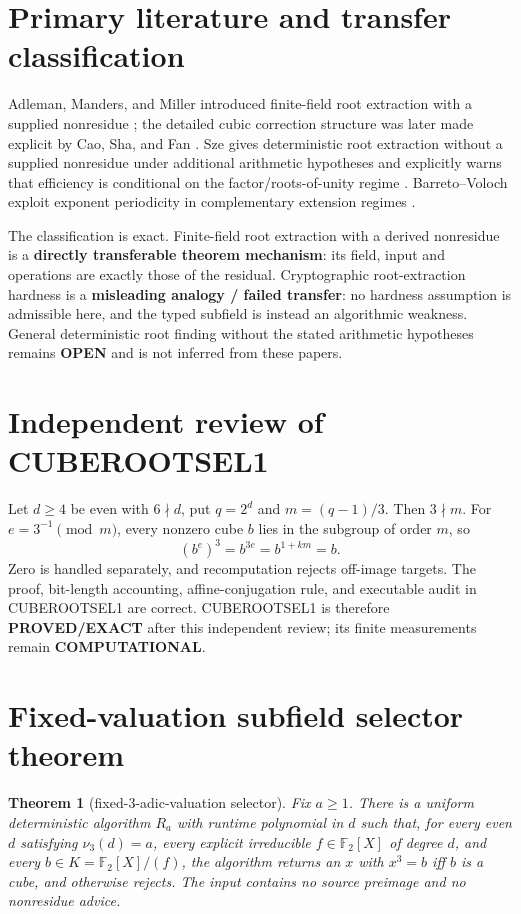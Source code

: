 \documentclass[11pt]{article}
\newcommand{\EXACT}{\textbf{PROVED/EXACT}}
\newcommand{\COMP}{\textbf{COMPUTATIONAL}}
\newcommand{\OPEN}{\textbf{OPEN}}
\newtheorem{theorem}{Theorem}
\begin{document}
\section{Primary literature and transfer classification}
Adleman, Manders, and Miller introduced finite-field root extraction with a
supplied nonresidue \cite{AMM}; the detailed cubic correction structure was
later made explicit by Cao, Sha, and Fan \cite{Cao}.  Sze gives deterministic
root extraction without a supplied nonresidue under additional arithmetic
hypotheses and explicitly warns that efficiency is conditional on the
factor/roots-of-unity regime \cite{Sze}.  Barreto--Voloch exploit exponent
periodicity in complementary extension regimes \cite{BV}.

The classification is exact.  Finite-field root extraction with a derived
nonresidue is a \textbf{directly transferable theorem mechanism}: its field,
input and operations are exactly those of the residual.  Cryptographic
root-extraction hardness is a \textbf{misleading analogy / failed transfer}:
no hardness assumption is admissible here, and the typed subfield is instead
an algorithmic weakness.  General deterministic root finding without the
stated arithmetic hypotheses remains \OPEN{} and is not inferred from these
papers.

\section{Independent review of CUBEROOTSEL1}
Let $d\ge4$ be even with $6\nmid d$, put
$q=2^d$ and $m=(q-1)/3$.  Then $3\nmid m$.  For
$e=3^{-1}\pmod m$, every nonzero cube $b$ lies in the subgroup of order $m$,
so
\[
  (b^e)^3=b^{3e}=b^{1+km}=b.
\]
Zero is handled separately, and recomputation rejects off-image targets.
The proof, bit-length accounting, affine-conjugation rule, and executable
audit in CUBEROOTSEL1 are correct.  CUBEROOTSEL1 is therefore \EXACT{} after
this independent review; its finite measurements remain \COMP{}.

\section{Fixed-valuation subfield selector theorem}
\begin{theorem}[fixed-$3$-adic-valuation selector]
Fix $a\ge1$.  There is a uniform deterministic algorithm $R_a$ with runtime
polynomial in $d$ such that, for every even $d$ satisfying $\nu_3(d)=a$, every
explicit irreducible $f\in\mathbb F_2[X]$ of degree $d$, and every
$b\in K=\mathbb F_2[X]/(f)$, the algorithm returns an $x$ with $x^3=b$ iff
$b$ is a cube, and otherwise rejects.  The input contains no source preimage
and no nonresidue advice.
\end{theorem}
\end{document}
